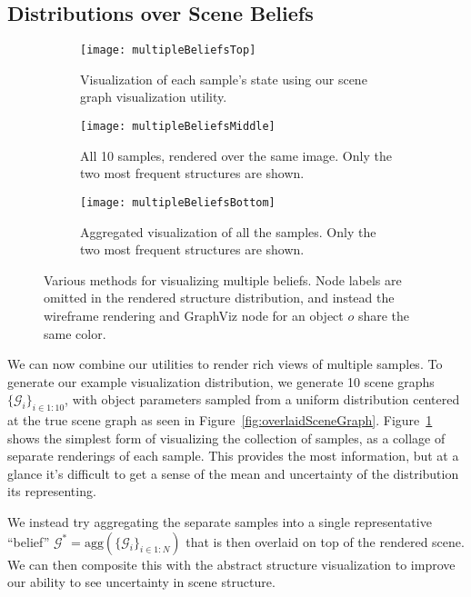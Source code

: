 \subsection{Distributions over Scene Beliefs}
\begin{figure}[H]
  \begin{subfigure}[b]{\textwidth}
    \centering
    \texttt{[image: multipleBeliefsTop]}
    \caption{
      Visualization of each sample's state using our scene graph visualization utility.
    }
    \label{fig:multipleBeliefsTop}
  \end{subfigure}
  \begin{subfigure}[b]{\textwidth}
    \centering
    \texttt{[image: multipleBeliefsMiddle]}
    \caption{
      All 10 samples, rendered over the same image. Only the two most frequent structures are shown.
    }
    \label{fig:multipleBeliefsMiddle}
  \end{subfigure}
  \begin{subfigure}[b]{\textwidth}
    \centering
    \texttt{[image: multipleBeliefsBottom]}
    \caption{
      Aggregated visualization of all the samples. Only the two most frequent structures are shown.
    }
    \label{fig:multipleBeliefsBottom}
  \end{subfigure}
  \caption{
    Various methods for visualizing multiple beliefs.
    Node labels are omitted in the rendered structure distribution, and instead the wireframe rendering and GraphViz node for an object $o$ share the same color.
  }
  \label{fig:multipleBeliefs}
\end{figure}

We can now combine our utilities to render rich views of multiple samples.
To generate our example visualization distribution, we generate 10 scene graphs $\{\mathcal{G}_i\}_{i \in 1:10}$, with object parameters sampled from a uniform distribution centered at the true scene graph as seen in Figure~\ref{fig:overlaidSceneGraph}.
Figure~\ref{fig:multipleBeliefsTop} shows the simplest form of visualizing the collection of samples, as a collage of separate renderings of each sample.
This provides the most information, but at a glance it's difficult to get a sense of the mean and uncertainty of the distribution its representing.

We instead try aggregating the separate samples into a single representative ``belief'' $\mathcal{G}^* = \mathrm{agg}(\{\mathcal{G}_i\}_{i \in 1:N})$ that is then overlaid on top of the rendered scene.
We can then composite this with the abstract structure visualization to improve our ability to see uncertainty in scene structure.

